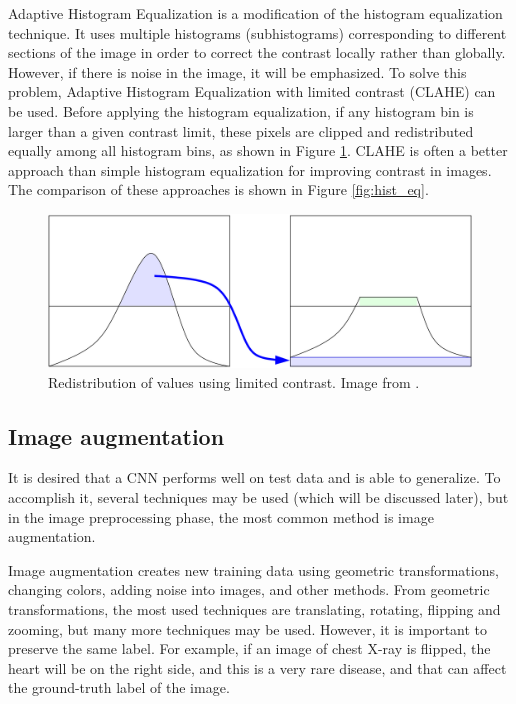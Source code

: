 \documentclass[thesis=B,english]{FITthesis}[2019/12/23]
\begin{document}
Adaptive Histogram Equalization is a modification of the histogram equalization technique. It uses multiple histograms (subhistograms) corresponding to different sections of the image in order to correct the contrast locally rather than globally. However, if there is noise in the image, it will be emphasized. To solve this problem, Adaptive Histogram Equalization with limited contrast (CLAHE) can be used. Before applying the histogram equalization, if any histogram bin is larger than a given contrast limit, these pixels are clipped and redistributed equally among all histogram bins, as shown in Figure \ref{fig:clahe}.\cite{PIZER1987355} CLAHE is often a better approach than simple histogram equalization for improving contrast in images. The comparison of these approaches is shown in Figure \ref{fig:hist_eq}.

\begin{figure}[ht]
		\includegraphics[scale=0.15]{images/clahe.png}
		\centering
		\caption{Redistribution of values using limited contrast. Image from \cite{wiki_ahe}.}
		\label{fig:clahe}
\end{figure}

\subsection{Image augmentation}
It is desired that a CNN performs well on test data and is able to generalize. To accomplish it, several techniques may be used (which will be discussed later), but in the image preprocessing phase, the most common method is image augmentation. 

Image augmentation creates new training data using geometric transformations, changing colors, adding noise into images, and other methods. From geometric transformations, the most used techniques are translating, rotating, flipping and zooming, but many more techniques may be used. However, it is important to preserve the same label. For example, if an image of chest X-ray is flipped, the heart will be on the right side, and this is a very rare disease, and that can affect the ground-truth label of the image.
\end{document}
